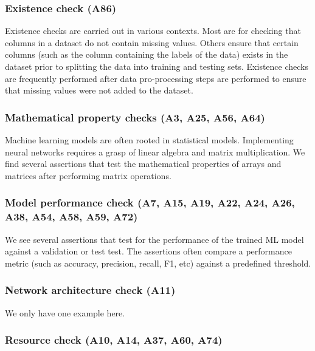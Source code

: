 
\subsubsection{Existence check (A86)}

Existence checks are carried out in various contexts. Most are for checking that columns in a dataset do not contain missing values. Others ensure that certain columns (such as the column containing the labels of the data) exists in the dataset prior to splitting the data into training and testing sets. Existence checks are frequently performed after data pro-processing  steps are performed to ensure that missing values were not added to the dataset.


\subsubsection{Mathematical property checks (A3, A25, A56, A64)}

Machine learning models are often rooted in statistical models. Implementing neural networks requires a grasp of linear algebra and matrix multiplication. We find several assertions that test the mathematical properties of arrays and matrices after performing matrix operations.

\subsubsection{Model performance check (A7, A15, A19, A22, A24, A26, A38, A54, A58, A59, A72)}

We see several assertions that test for the performance of the trained ML model against a validation or test test. The assertions often compare a performance metric (such as accuracy, precision, recall, F1, etc) against a predefined threshold.

\subsubsection{Network architecture check (A11)}

We only have one example here.

\subsubsection{Resource check (A10, A14, A37, A60, A74)}


